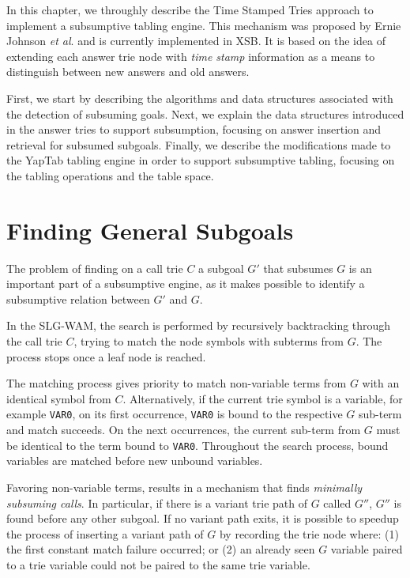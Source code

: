 In this chapter, we throughly describe the Time Stamped Tries approach
to implement a subsumptive tabling engine. This mechanism was proposed by
Ernie Johnson \textit{et al}. \cite{Johnson-99} and is currently implemented in XSB.
It is based on the idea of extending each answer trie node with \textit{time stamp}
information as a means to distinguish between new answers and old answers.

First, we start by describing the algorithms and data structures associated
with the detection of subsuming goals. Next, we explain the data structures
introduced in the answer tries to support subsumption, focusing on answer insertion
and retrieval for subsumed subgoals. Finally, we describe the modifications made to the YapTab
tabling engine in order to support subsumptive tabling, focusing on the tabling operations and the table space.

\section{Finding General Subgoals}\label{sec:lookup_subsuming}

The problem of finding on a call trie $C$ a subgoal $G'$ that subsumes $G$ 
is an important part of a subsumptive engine, as it makes possible to identify
a subsumptive relation between $G'$ and $G$.

In the SLG-WAM, the search is performed by recursively backtracking through the call trie $C$, trying
to match the node symbols with subterms from $G$. The process stops once a leaf node is reached.

The matching process gives priority to match non-variable terms from $G$
with an identical symbol from $C$.
Alternatively, if the current trie symbol is a variable, for example \texttt{VAR0}, on its first occurrence, \texttt{VAR0}
is bound to the respective $G$ sub-term
and match succeeds. On the next occurrences, the current sub-term from $G$ must
be identical to the term bound to \texttt{VAR0}. Throughout the search process, bound variables are
matched before new unbound variables.

Favoring non-variable terms, results in a mechanism that finds \textit{minimally subsuming calls}.
In particular, if there is a variant trie path of $G$ called $G''$, $G''$ is found before any other subgoal.
If no variant path exits, it is possible to speedup the process of inserting a variant path of $G$
by recording the trie node where: (1) the first constant match
failure occurred; or (2) an already seen $G$ variable paired to a trie variable could
not be paired to the same trie variable.

